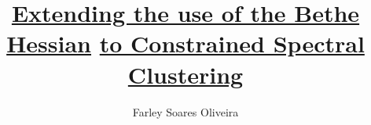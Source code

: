 

% 
\documentclass[a4paper,11pt]{jreport}

\usepackage[dvipdfmx]{graphicx}  
\usepackage{amsmath}
\usepackage{amsfonts}
\usepackage{varioref}
\usepackage[shortlabels]{enumitem}


\DeclareMathOperator{\cut}{cut\,}
\DeclareMathOperator{\spn}{span\,}
\DeclareMathOperator*{\vol}{vol\,}
\DeclareMathOperator*{\ncut}{Ncut\,}
\DeclareMathOperator*{\argmin}{\arg\!\min}



\usepackage[left=25truemm,top=35truemm,right=25truemm,bottom=50truemm]{geometry}
\usepackage{times} %

\setcounter{tocdepth}{3}
\setcounter{page}{-1}

\setlength{\parskip}{0em}
\setlength{\topsep}{0em}


\usepackage{coins-jp-utf8}

\title{\underline{Extending the use of the Bethe Hessian} \underline{to Constrained Spectral Clustering}}
\author{Farley Soares Oliveira}

